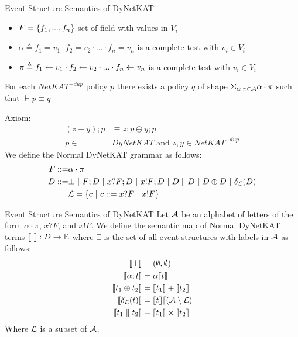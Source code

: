 \begin{frame}{Event Structure Semantics of DyNetKAT}
    \begin{itemize}
        \item $F = \{f_1,...,f_n\}$ set of field with values in $V_i$
        \item $\alpha \triangleq f_1=v_1\cdot f_2 = v_2 \cdot  ... \cdot f_n = v_n$ 
        is a complete test with $v_i \in V_i$
        \item $\pi \triangleq f_1\leftarrow v_1\cdot f_2 \leftarrow v_2 \cdot  ... \cdot f_n \leftarrow v_n$ 
        is a complete test with $v_i \in V_i$
    \end{itemize}
    For each $NetKAT^{-dup}$ policy $p$ there exists a policy $q$ 
    of shape $\Sigma_{\alpha\cdot\pi \in \mathcal{A}}\alpha\cdot\pi$
    such that $\vdash p \equiv q$

    Axiom:
    \begin{align*}
        (z+y);p & \equiv z;p \oplus y;p \\
        p \in & DyNetKAT \text{ and } z,y \in NetKAT^{-dup}
    \end{align*}
    We define the Normal DyNetKAT grammar as follows:
    \begin{align*}
        F ::= & \alpha\cdot\pi                                                                           \\
        D ::= & \bot ~|~ F;D ~|~ x?F;D ~|~ x!F;D ~|~ D \parallel D ~|~ D \oplus D ~|~ \delta_{\mathcal{L}}(D) \\
              & \mathcal{L} = \{c ~|~ c ::= x?F ~|~ x!F\}
    \end{align*}
\end{frame}

\begin{frame}{Event Structure Semantics of DyNetKAT}
    Let $\mathcal{A}$ be an alphabet of letters of the form
    $\alpha \cdot \pi$,
    $x?F$, and $x!F$.
    We define the semantic map of Normal DyNetKAT terms
    $\llbracket  \  \rrbracket: D \rightarrow \mathbb{E}$ where
    $\mathbb{E}$ is the set of all event structures with
    labels in $\mathcal{A}$ as follows:    
    \begin{align*}
        \llbracket \bot \rrbracket      & = (\emptyset,\emptyset)                  \\
        \llbracket \alpha; t \rrbracket & = \alpha\llbracket t \rrbracket                        \\
        \llbracket t_1 \oplus t_2 \rrbracket
                        & = \llbracket t_1 \rrbracket + \llbracket t_2 \rrbracket                  \\
        \llbracket \delta_{\mathcal{L}}(t) \rrbracket
                        & = \llbracket t \rrbracket \lceil (\mathcal{A} \setminus \mathcal{L}) \\
        \llbracket t_1 \parallel t_2 \rrbracket
                        & = \llbracket t_1 \rrbracket \times \llbracket t_2 \rrbracket
    \end{align*}
    Where $\mathcal{L}$ is a subset of $\mathcal{A}$.
\end{frame}